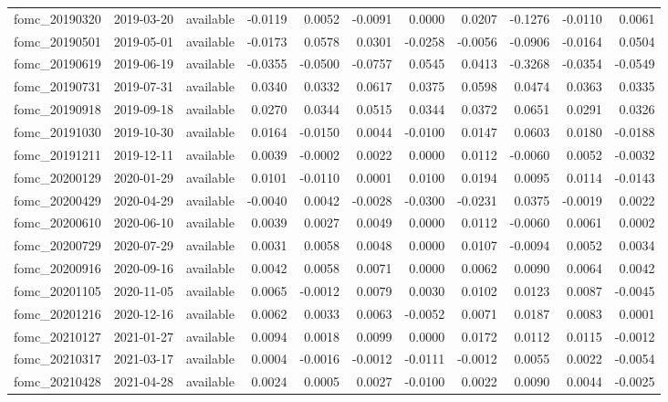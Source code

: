 \begin{tabular}{lllrrrrrrrr}
fomc_20190320 & 2019-03-20 & available & -0.0119 & 0.0052 & -0.0091 & 0.0000 & 0.0207 & -0.1276 & -0.0110 & 0.0061 \\
fomc_20190501 & 2019-05-01 & available & -0.0173 & 0.0578 & 0.0301 & -0.0258 & -0.0056 & -0.0906 & -0.0164 & 0.0504 \\
fomc_20190619 & 2019-06-19 & available & -0.0355 & -0.0500 & -0.0757 & 0.0545 & 0.0413 & -0.3268 & -0.0354 & -0.0549 \\
fomc_20190731 & 2019-07-31 & available & 0.0340 & 0.0332 & 0.0617 & 0.0375 & 0.0598 & 0.0474 & 0.0363 & 0.0335 \\
fomc_20190918 & 2019-09-18 & available & 0.0270 & 0.0344 & 0.0515 & 0.0344 & 0.0372 & 0.0651 & 0.0291 & 0.0326 \\
fomc_20191030 & 2019-10-30 & available & 0.0164 & -0.0150 & 0.0044 & -0.0100 & 0.0147 & 0.0603 & 0.0180 & -0.0188 \\
fomc_20191211 & 2019-12-11 & available & 0.0039 & -0.0002 & 0.0022 & 0.0000 & 0.0112 & -0.0060 & 0.0052 & -0.0032 \\
fomc_20200129 & 2020-01-29 & available & 0.0101 & -0.0110 & 0.0001 & 0.0100 & 0.0194 & 0.0095 & 0.0114 & -0.0143 \\
fomc_20200429 & 2020-04-29 & available & -0.0040 & 0.0042 & -0.0028 & -0.0300 & -0.0231 & 0.0375 & -0.0019 & 0.0022 \\
fomc_20200610 & 2020-06-10 & available & 0.0039 & 0.0027 & 0.0049 & 0.0000 & 0.0112 & -0.0060 & 0.0061 & 0.0002 \\
fomc_20200729 & 2020-07-29 & available & 0.0031 & 0.0058 & 0.0048 & 0.0000 & 0.0107 & -0.0094 & 0.0052 & 0.0034 \\
fomc_20200916 & 2020-09-16 & available & 0.0042 & 0.0058 & 0.0071 & 0.0000 & 0.0062 & 0.0090 & 0.0064 & 0.0042 \\
fomc_20201105 & 2020-11-05 & available & 0.0065 & -0.0012 & 0.0079 & 0.0030 & 0.0102 & 0.0123 & 0.0087 & -0.0045 \\
fomc_20201216 & 2020-12-16 & available & 0.0062 & 0.0033 & 0.0063 & -0.0052 & 0.0071 & 0.0187 & 0.0083 & 0.0001 \\
fomc_20210127 & 2021-01-27 & available & 0.0094 & 0.0018 & 0.0099 & 0.0000 & 0.0172 & 0.0112 & 0.0115 & -0.0012 \\
fomc_20210317 & 2021-03-17 & available & 0.0004 & -0.0016 & -0.0012 & -0.0111 & -0.0012 & 0.0055 & 0.0022 & -0.0054 \\
fomc_20210428 & 2021-04-28 & available & 0.0024 & 0.0005 & 0.0027 & -0.0100 & 0.0022 & 0.0090 & 0.0044 & -0.0025 \\

\end{tabular}

